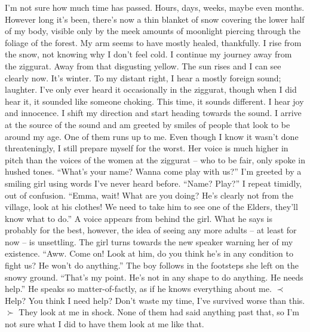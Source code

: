 \documentclass[openany, 12pt]{book}
\newcommand\tab[1][1cm]{\hspace*{#1}}
\begin{document}
\tab
I’m not sure how much time has passed. Hours, days, weeks, maybe even months. However long it’s been, there’s now a thin blanket of snow covering the lower half of my body, visible only by the meek amounts of moonlight piercing through the foliage of the forest. My arm seems to have mostly healed, thankfully. I rise from the snow, not knowing why I don’t feel cold. I continue my journey away from the ziggurat. Away from that disgusting yellow.\newline
\tab
The sun rises and I can see clearly now. It’s winter. To my distant right, I hear a mostly foreign sound; laughter. I’ve only ever heard it occasionally in the ziggurat, though when I did hear it, it sounded like someone choking. This time, it sounds different. I hear joy and innocence. I shift my direction and start heading towards the sound.\newline
\tab
I arrive at the source of the sound and am greeted by smiles of people that look to be around my age. One of them runs up to me. Even though I know it wasn’t done threateningly, I still prepare myself for the worst. Her voice is much higher in pitch than the voices of the women at the ziggurat -- who to be fair, only spoke in hushed tones.
\newline
\tab
``What’s your name? Wanna come play with us?'' I’m greeted by a smiling girl using words I’ve never heard before.\newline
\tab
``Name? Play?'' I repeat timidly, out of confusion.\newline
\tab
``Emma, wait! What are you doing? He’s clearly not from the village, look at his clothes! We need to take him to see one of the Elders, they’ll know what to do.'' A voice appears from behind the girl. What he says is probably for the best, however, the idea of seeing any more adults -- at least for now -- is unsettling.\newline
\tab
The girl turns towards the new speaker warning her of my existence. ``Aww. Come on! Look at him, do you think he’s in any condition to fight us? He won’t do anything.''\newline
\tab
The boy follows in the footsteps she left on the snowy ground. ``That’s my point. He’s not in any shape to do anything. He needs help.'' He speaks so matter-of-factly, as if he knows everything about me.\newline
$\prec$Help? You think I need help? Don’t waste my time, I’ve survived worse than this.$\succ$\newline
\tab
They look at me in shock. None of them had said anything past that, so I’m not sure what I did to have them look at me like that.
\end{document}

